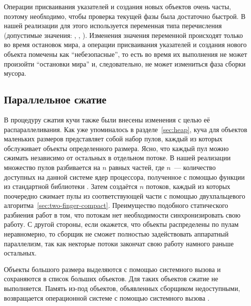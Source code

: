 Операции присваивания указателей и создания новых объектов очень часты, 
поэтому необходимо, чтобы проверка текущей фазы была достаточно быстрой. 
В нашей реализации для этого используется переменная  типа 
перечисления (допустимые значения: , , ). 
Изменения значения переменной  происходят только во время остановок мира, 
а операции присваивания указателей и создания нового объекта помечены как ``небезопасные'', 
то есть во время их выполнения не может произойти ``остановки мира'' и, следовательно, 
не может измениться фаза сборки мусора.


\subsection{Параллельное сжатие}
В процедуру сжатия кучи также были внесены изменения с целью её распараллеливания. 
Как уже упоминалось в разделе~\ref{sec:heap}, куча для объектов маленьких размеров 
представляет собой набор пулов, каждый из которых обслуживает объекты определенного размера. 
Ясно, что каждый пул можно сжимать независимо от остальных в отдельном потоке. 
В нашей реализации множество пулов разбивается на $n$ равных частей, 
где $n$~--- количество доступных на данной системе ядер процессора, 
полученное с помощью функции из стандартной библиотеки 
. 
Затем создаётся $n$ потоков, каждый из которых поочередно сжимает пулы из 
соответствующей части с помощью двухпальцевого алгоритма~\ref{sec:two-finger-compact}. 
Преимущество подобного статического разбиения работ в том, что потокам нет необходимости 
синхронизировать свою работу. 
С другой стороны, если окажется, что объекты распределены по пулам неравномерно, 
то сборщик не сможет полностью задействовать аппаратный параллелизм, так как некторые 
потоки закончат свою работу намного раньше остальных. 

Объекты большого размера выделяются с помощью системного вызова  и 
сохраняются в список больших объектов. 
Для таких объектов сжатие не выполняется. 
Память из-под объектов, объявленных сборщиком недоступными, возвращается операционной 
системе с помощью системного вызова .
